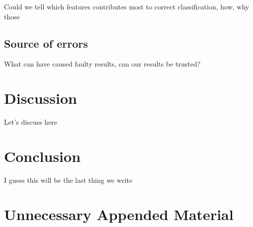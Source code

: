 \documentclass{kththesis}
\begin{document}
Could we tell which features contributes most to correct classification, how, why those

\section{Source of errors}

What can have caused faulty results, can our results be trusted?

\chapter{Discussion}

Let's discuss here

\chapter{Conclusion}

I guess this will be the last thing we write

\printbibliography[heading=bibintoc] %

\appendix

\chapter{Unnecessary Appended Material}
\end{document}

